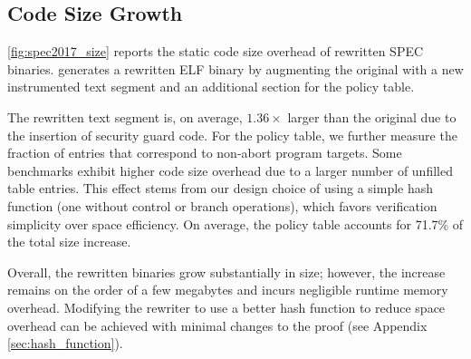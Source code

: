 

\subsection{Code Size Growth}
\autoref{fig:spec2017_size} reports the static code size overhead of rewritten SPEC binaries.
\pname generates a rewritten ELF binary by augmenting the original with a new instrumented text segment and an additional section for the policy table.

The rewritten text segment is, on average, $1.36\times$ larger than the original due to the insertion of security guard code.
For the policy table, we further measure the fraction of entries that correspond to non-abort program targets.
%
Some benchmarks exhibit higher code size overhead due to a larger number of unfilled table entries.
This effect stems from our design choice of using a simple hash function (\eg one without control or branch operations), which favors verification simplicity over space efficiency. On average, the policy table accounts for 71.7\% of the total size increase.

Overall, the rewritten binaries grow substantially in size; however, the increase remains on the order of a few megabytes and incurs negligible runtime memory overhead.
Modifying the rewriter to use a better hash function to reduce space overhead can be achieved with minimal changes to the proof (see Appendix \ref{sec:hash_function}).


